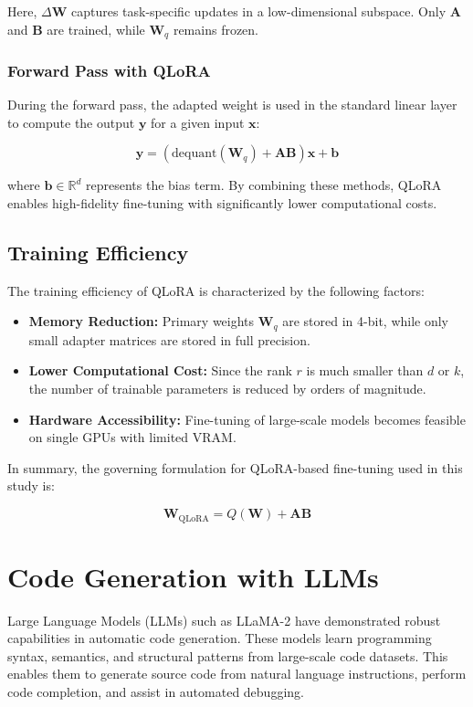Here, $\Delta \mathbf{W}$ captures task-specific updates in a low-dimensional subspace. Only $\mathbf{A}$ and $\mathbf{B}$ are trained, while $\mathbf{W}_q$ remains frozen.

\subsubsection{Forward Pass with QLoRA}
During the forward pass, the adapted weight is used in the standard linear layer to compute the output $\mathbf{y}$ for a given input $\mathbf{x}$:

\begin{equation}
\mathbf{y} = (\text{dequant}(\mathbf{W}_q) + \mathbf{A}\mathbf{B}) \mathbf{x} + \mathbf{b}
\end{equation}

where $\mathbf{b} \in \mathbb{R}^d$ represents the bias term. By combining these methods, QLoRA enables high-fidelity fine-tuning with significantly lower computational costs.

\subsection{Training Efficiency}
The training efficiency of QLoRA is characterized by the following factors:
\begin{itemize}
    \item \textbf{Memory Reduction:} Primary weights $\mathbf{W}_q$ are stored in 4-bit, while only small adapter matrices are stored in full precision.
    \item \textbf{Lower Computational Cost:} Since the rank $r$ is much smaller than $d$ or $k$, the number of trainable parameters is reduced by orders of magnitude.
    \item \textbf{Hardware Accessibility:} Fine-tuning of large-scale models becomes feasible on single GPUs with limited VRAM.
\end{itemize}

In summary, the governing formulation for QLoRA-based fine-tuning used in this study is:

\begin{equation}
\label{eq:qlora_final}
\boxed{\mathbf{W}_{\text{QLoRA}} = Q(\mathbf{W}) + \mathbf{A}\mathbf{B}}
\end{equation}

\section{Code Generation with LLMs}
Large Language Models (LLMs) such as LLaMA-2 have demonstrated robust capabilities in automatic code generation. These models learn programming syntax, semantics, and structural patterns from large-scale code datasets. This enables them to generate source code from natural language instructions, perform code completion, and assist in automated debugging.

